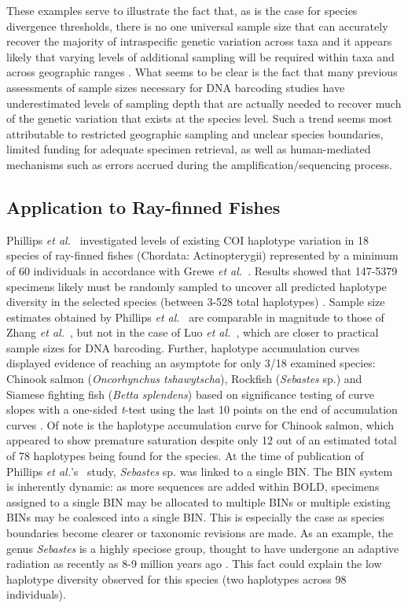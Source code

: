 These examples serve to illustrate the fact that, as is the case for species divergence thresholds, there is no one universal sample size that can accurately recover the majority of intraspecific genetic variation across taxa and it appears likely that varying levels of additional sampling will be required within taxa and across geographic ranges \cite{lou2012effect}. What seems to be clear is the fact that many previous assessments of sample sizes necessary for DNA barcoding studies have underestimated levels of sampling depth that are actually needed to recover much of the genetic variation that exists at the species level. Such a trend seems most attributable to restricted geographic sampling and unclear species boundaries, limited funding for adequate specimen retrieval, as well as human-mediated mechanisms such as errors accrued during the amplification/sequencing process. 

\subsection{Application to Ray-finned Fishes}

Phillips \textit{et al.}~\cite{phillips2015exploration} investigated levels of existing COI haplotype variation in 18 species of ray-finned fishes (Chordata: Actinopterygii) represented by a minimum of 60 individuals in accordance with Grewe \textit{et al.}~\cite{grewe1993mitochondrial}. Results showed that 147-5379 specimens likely must be randomly sampled to uncover all predicted haplotype diversity in the selected species (between 3-528 total haplotypes) \cite{phillips2015exploration}. Sample size estimates obtained by Phillips \textit{et al.}~\cite{phillips2015exploration} are comparable in magnitude to those of Zhang \textit{et al.}~\cite{zhang2010estimating}, but not in the case of Luo \textit{et al.}~\cite{luo2015simulation}, which are closer to practical sample sizes for DNA barcoding. Further, haplotype accumulation curves displayed evidence of reaching an asymptote for only 3/18 examined species: Chinook salmon (\textit{Oncorhynchus tshawytscha}), Rockfish (\textit{Sebastes} sp.) and Siamese fighting fish (\textit{Betta splendens}) based on significance testing of curve slopes with a one-sided \textit{t}-test using the last 10 points on the end of accumulation curves \cite{phillips2015exploration}. Of note is the haplotype accumulation curve for Chinook salmon, which appeared to show premature saturation despite only 12 out of an estimated total of 78 haplotypes being found for the species. At the time of publication of Phillips \textit{et al.}'s~\cite{phillips2015exploration} study, \textit{Sebastes} sp. was linked to a single BIN. The BIN system is inherently dynamic: as more sequences are added within BOLD, specimens assigned to a single BIN may be allocated to multiple BINs or multiple existing BINs may be coalesced into a single BIN. This is especially the case as species boundaries become clearer or taxonomic revisions are made. As an example, the genus \textit{Sebastes} is a highly speciose group, thought to have undergone an adaptive radiation as recently as 8-9 million years ago \cite{steinke2009dna}. This fact could explain the low haplotype diversity observed for this species (two haplotypes across 98 individuals).


